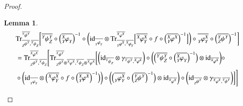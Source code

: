 \documentclass{amsart}
\def\tn{\textnormal}
\def\Trace{\tn{Tr}}
\def\ol{\overline}
\def\id{\tn{id}}
\newcommand{\feeddd}[3]{{\tensor*[^{#2}_{\color{white}{!}}]{{#1}}{^{#3}}}}%
\newcommand{\feeddc}[3]{{\tensor*[^{#2}]{{#1}}{_{#3}}}}
\newcommand{\feedcd}[3]{{\tensor*[_{#2}]{{#1}}{^{#3}}}}
\newcommand{\feedcc}[3]{{\tensor*[^{\color{white}{!}}_{#2}]{{#1}}{_{#3}}}}
\newcommand{\feedda}[3]{{\tensor*[^{#2}_{\color{white}{!}}]{{#1}}{^{#2}_{#3}}}}
\newcommand{\feedca}[3]{{\tensor*[_{#2}]{{#1}}{_{#2}^{#3}}}}
\newcommand{\feedad}[3]{{\tensor*[^{#2}_{#3}]{{#1}}{^{#2}}}}
\newcommand{\feedac}[3]{{\tensor*[_{#2}^{#3}]{{#1}}{_{#2}}}}
\newtheorem{lemma}[subsection]{Lemma}
\theoremstyle{remark}
\theoremstyle{definition}
\begin{document}
\begin{proof}
\begin{lemma}\label{le:combining traces}
\begin{align*}
&\Trace^{\ol{\feeddd{\psi}{Y}{Y}}}_{\ol{\feedcd{\psi}{Z}{Y}},\ol{\feeddc{\psi}{Y}{Z}}}
\bigg[\ol{\feedda{\psi}{Y}{Z}}\circ\Big(\ol{\feedac{\varphi}{Y}{X}}\Big)^{-1}\circ\bigg(\id_{\ol{\feedcc{\varphi}{Y}{Y}}}\otimes \Trace^{\ol{\feeddd{\varphi}{X}{X}}}_{\ol{\feedcd{\varphi}{Y}{X}},\ol{\feeddc{\varphi}{X}{Y}}}\Big[\ol{\feedda{\varphi}{X}{Y}}\circ f\circ\Big(\ol{\feedad{\varphi}{X}{Y}}\Big)^{-1}\Big]\bigg)\circ\ol{\feedca{\varphi}{Y}{X}}\circ\Big(\ol{\feedad{\psi}{Y}{Z}}\Big)^{-1}\bigg]\\
&=\Trace^{\ol{\feeddd{\varphi}{X}{X}}}_{\ol{\feedcd{\psi}{Z}{Y}},\ol{\feeddc{\psi}{Y}{Z}}}\Bigg[
\Trace^{\ol{\feeddd{\psi}{Y}{Y}}}_{\ol{\feedcd{\psi}{Z}{Y}}\otimes\ol{\feeddd{\varphi}{X}{X}},\ol{\feeddc{\psi}{Y}{Z}}\otimes\ol{\feeddd{\varphi}{X}{X}}}\bigg[
\bigg(\id_{\ol{\feeddc{\psi}{Y}{Z}}}\otimes\gamma_{\ol{\feeddd{\psi}{Y}{Y}},\ol{\feeddd{\varphi}{X}{X}}}\bigg)\circ\bigg(\Big(\ol{\feedda{\psi}{Y}{Z}}\circ\Big(\ol{\feedac{\varphi}{Y}{X}}\Big)^{-1}\Big)\otimes\id_{\ol{\feeddd{\varphi}{X}{X}}}\bigg)\circ\\
&\circ\bigg(\id_{\ol{\feedcc{\varphi}{Y}{Y}}}\otimes\Big(\ol{\feedda{\varphi}{X}{Y}}\circ f\circ\Big(\ol{\feedad{\varphi}{X}{Y}}\Big)^{-1}\Big)\bigg)\circ\bigg(\Big(\ol{\feedca{\varphi}{Y}{X}}\circ\Big(\ol{\feedad{\psi}{Y}{Z}}\Big)^{-1}\Big)\otimes\id_{\ol{\feeddd{\varphi}{X}{X}}}\bigg)\circ\bigg(\id_{\ol{\feedcd{\psi}{Z}{Y}}}\otimes\gamma_{\ol{\feeddd{\varphi}{X}{X}},\ol{\feeddd{\psi}{Y}{Y}}}\bigg)\bigg]\Bigg]\\
\end{align*}
\end{lemma}


\end{proof}
\end{document}
